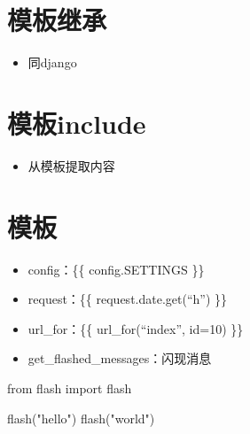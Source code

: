 \documentclass[11pt]{article}
\providecommand{\tightlist}{%
      \setlength{\itemsep}{0pt}\setlength{\parskip}{0pt}}
\newenvironment{Shaded}{}{}
\newcommand{\StringTok}[1]{\textcolor[rgb]{0.25,0.44,0.63}{{#1}}}
\newcommand{\NormalTok}[1]{{#1}}
\newcommand{\ImportTok}[1]{{#1}}
\begin{document}
    \hypertarget{ux6a21ux677fux7ee7ux627f}{%
\section{模板继承}\label{ux6a21ux677fux7ee7ux627f}}

\begin{itemize}
\tightlist
\item
  同django
\end{itemize}

\hypertarget{ux6a21ux677finclude}{%
\section{模板include}\label{ux6a21ux677finclude}}

\begin{itemize}
\tightlist
\item
  从模板提取内容
\end{itemize}

\begin{Shaded}
\begin{Highlighting}[]
\NormalTok{\{\textbackslash{}% include "index.html" %\}}
\NormalTok{\{\textbackslash{}% include 'hello.html' ignore missing %\}}
\end{Highlighting}
\end{Shaded}

    \hypertarget{ux6a21ux677f}{%
\section{模板}\label{ux6a21ux677f}}

\begin{itemize}
\tightlist
\item
  config：\{\{ config.SETTINGS \}\}
\item
  request：\{\{ request.date.get(``h'') \}\}
\item
  url\_for：\{\{ url\_for(``index'', id=10) \}\}
\item
  get\_flashed\_messages：闪现消息
\end{itemize}

\begin{Shaded}
\begin{Highlighting}[]
\ImportTok{from}\NormalTok{ flash }\ImportTok{import}\NormalTok{ flash}

\NormalTok{flash(}\StringTok{"hello"}\NormalTok{)}
\NormalTok{flash(}\StringTok{"world"}\NormalTok{)}
\end{Highlighting}
\end{Shaded}
\end{document}
